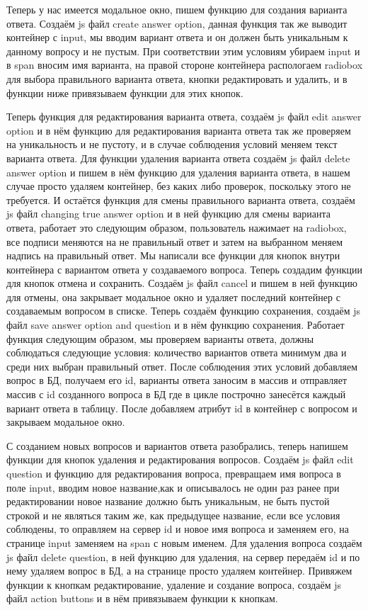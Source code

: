 \documentclass[12pt, oldlfont, amsfonts]{report}
\begin{document}
Теперь у нас имеется модальное окно, пишем функцию для создания варианта ответа. Создаём js файл {create answer option}, данная функция так же выводит контейнер с input, мы вводим вариант ответа и он должен быть уникальным к данному вопросу и не пустым. При соответствии этим условиям убираем input и в span вносим имя варианта, на правой стороне контейнера распологаем radiobox для выбора правильного варианта ответа, кнопки редактировать и удалить, и в функции ниже привязываем функции для этих кнопок.

Теперь функция для редактирования варианта ответа, создаём js файл { edit answer option} и в нём функцию для редактирования варианта ответа так же проверяем на уникальность и не пустоту, и в случае соблюдения условий меняем текст варианта ответа. Для функции удаления варианта ответа создаём js файл { delete answer option} и пишем в нём функцию для удаления варианта ответа, в нашем случае просто удаляем контейнер, без каких либо проверок, поскольку этого не требуется. И остаётся функция для смены правильного варианта ответа, создаём js файл { changing true answer option} и в ней функцию для смены варианта ответа, работает это следующим образом, пользователь нажимает на { radiobox}, все подписи меняются на { не правильный ответ} и затем на выбранном меняем надпись на { правильный ответ}. Мы написали все функции для кнопок внутри контейнера с вариантом ответа у создаваемого вопроса. Теперь создадим функции для кнопок { отмена} и { сохранить}. Создаём js файл { cancel} и пишем в ней функцию для отмены, она закрывает модальное окно и удаляет последний контейнер с создаваемым вопросом в списке. Теперь создаём функцию сохранения, создаём js файл { save answer option and question} и в нём функцию сохранения. Работает функция следующим образом, мы проверяем варианты ответа, должны соблюдаться следующие условия: количество вариантов ответа минимум два и среди них выбран правильный ответ. После соблюдения этих условий добавляем вопрос в БД, получаем его { id}, варианты ответа заносим в массив и отправляет массив с { id} созданного вопроса в БД где в цикле построчно занесётся каждый вариант ответа в таблицу. После добавляем атрибут { id} в контейнер с вопросом и закрываем модальное окно.

С созданием новых вопросов и вариантов ответа разобрались, теперь напишем функции для кнопок удаления и редактирования вопросов. Создаём js файл { edit question} и функцию для редактирования вопроса, превращаем имя вопроса в поле input, вводим новое название,как и описывалось не один раз ранее при редактировании новое название должно быть уникальным, не быть пустой строкой и не являться таким же, как предыдущее название, если все условия соблюдены, то оправляем на сервер id и новое имя вопроса и заменяем его, на странице input заменяем на span с новым именем. Для удаления вопроса создаём js файл { delete question}, в ней функцию для удаления, на сервер передаём id и по нему удаляем вопрос в БД, а на странице просто удаляем контейнер. Привяжем функции к кнопкам редактирование, удаление и создание вопроса, создаём js файл { action buttons} и в нём привязываем функции к кнопкам.
\end{document}
